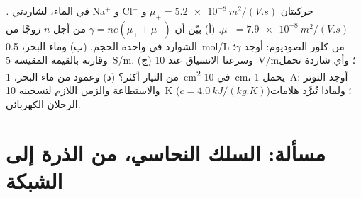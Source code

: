 \begin{exercise}[$\star\star\star$]\label{exo:b2:charges-currents-conduction:12}
\emph{.} في الماء، لشاردتي Na$^+$ و Cl$^-$ حركيتان
$\mu_+ = \qty{5.2e-8}{m^2/(V.s)}$ و $\mu_- = \qty{7.9e-8}{m^2/(V.s)}$. (أ)
بيّن أن $\gamma = ne(\mu_+ + \mu_-)$ من أجل $n$ زوجًا من الشوارد في واحدة الحجم.
(ب) وماء البحر، \qty{0.5}{mol/L} من كلور الصوديوم: أوجد $\gamma$؛ وقارنه بالقيمة المقيسة
\qty{5}{S/m}. (ج) وسرعتا الانسياق عند \qty{10}{V/m}؛ وأي شاردة تحمل من
التيار أكثر؟ (د) وعمود من ماء البحر، \qty{1}{cm^2} في \qty{10}{cm}، يحمل
\qty{1}{A}: أوجد التوتر والاستطاعة والزمن اللازم لتسخينه \qty{10}{K} ($c =
\qty{4.0}{kJ/(kg.K)}$)؛ ولماذا تُبرَّد هلامات الرحلان الكهربائي.
\end{exercise}

\section{مسألة: السلك النحاسي، من الذرة إلى الشبكة}

